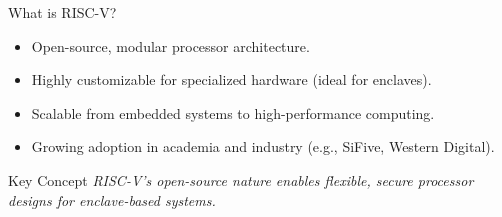 \documentclass[aspectratio=169]{beamer}
\begin{document}
\begin{frame}{What is RISC-V?}
\begin{itemize}
    \item Open-source, modular processor architecture.
    \item Highly customizable for specialized hardware (ideal for enclaves).
    \item Scalable from embedded systems to high-performance computing.
    \item Growing adoption in academia and industry (e.g., SiFive, Western Digital).
\end{itemize}
\begin{block}{Key Concept}
\textit{RISC-V’s open-source nature enables flexible, secure processor designs for enclave-based systems.}
\end{block}
\end{frame}
\end{document}
